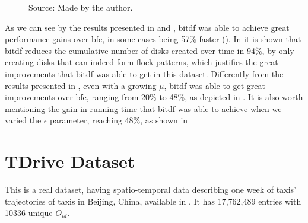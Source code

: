 {\begin{figure}[h!]
\begin{subfigure}[t]{0.48\textwidth}
        \label{fig:berlinmod_disks}
    \end{subfigure}
    \footnotesize{Source: Made by the author.}
    \label{fig:berlinmod_results2}
\end{figure}

As we can see by the results presented in  and , \ac{bitdf}
was able to achieve great performance gains over \ac{bfe}, in some cases being 57\% faster
(). In  it is shown that \ac{bitdf} reduces the cumulative
number of disks created over time in 94\%, by only creating disks that can indeed form flock patterns, which justifies
the great improvements that \ac{bitdf} was able to get in this dataset. Differently from the results presented in
, even with a growing $\mu$, \ac{bitdf} was able to get great improvements over \ac{bfe}, ranging
from 20\% to 48\%, as depicted in . It is also worth mentioning the gain in running time
that \ac{bitdf} was able to achieve when we varied the $\epsilon$ parameter, reaching 48\%, as shown in

\section{TDrive Dataset}
\label{sec:tdrive}
This is a real dataset, having spatio-temporal data describing one week of taxis' trajectories of taxis in Beijing,
China, available in \citep{tdrive}. It has 17,762,489 entries with 10336 unique $O_{id}$.

}
